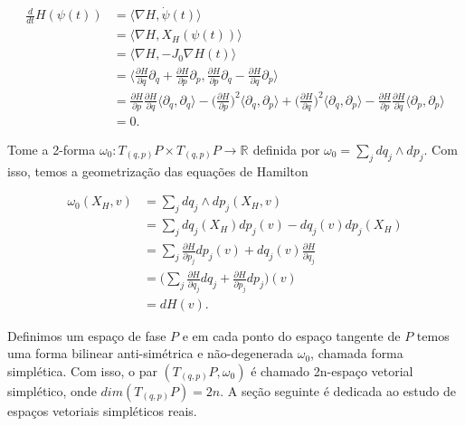 \documentclass[12pt]{book}
\newcommand{\bigparenteses}[1]{\Big( #1 \Big) }
\newcommand{\campohamiltoniano}[1]{X_{H}(#1)}
\newcommand{\campohamiltonianoabrev}{X_{H}}
\newcommand{\derivada}[2]{\frac{d #1}{d #2}}
\newcommand{\derivadaparcial}[2]{\frac{\partial #1}{\partial #2}}
\newcommand{\derivadaparcialabrev}[1]{\partial_{#1}}
\newcommand{\estruturacomplexa}{J_{0}}
\newcommand{\formaSimpleticaabrev}{\omega_{0}}
\newcommand{\formaSimpleticaPadrao}[2]{\omega_{0}(#1, #2)}
\newcommand{\produtointerno}[2]{\langle #1, #2 \rangle}
\newcommand{\real}[1]{\mathbb{R}^{#1}}
\newcommand{\reta}{\real{}}
\begin{document}
	$$
	\begin{aligned}
	\derivada{}{t}H(\psi(t)) 
	&= \produtointerno{\nabla H}{\dot{\psi}(t)} 
	\\
	&= \produtointerno{\nabla H}{\campohamiltoniano{\psi(t)}} 
	\\
	&= 
	\produtointerno{\nabla H}{-\estruturacomplexa \nabla H(t)} 
	\\
	&=\produtointerno{\derivadaparcial{H}{q}\derivadaparcialabrev{q} + \derivadaparcial{H}{p}\derivadaparcialabrev{p}
	}{\derivadaparcial{H}{p}\derivadaparcialabrev{q} - \derivadaparcial{H}{q}\derivadaparcialabrev{p}}
	\\
	&=\derivadaparcial{H}{p}\derivadaparcial{H}{q}\produtointerno{\derivadaparcialabrev{q}}{\derivadaparcialabrev{q}}-\bigparenteses{\derivadaparcial{H}{p}}^{2}\produtointerno{\derivadaparcialabrev{q}
	}{\derivadaparcialabrev{p}}	
	+\bigparenteses{\derivadaparcial{H}{q}}^{2}\produtointerno{\derivadaparcialabrev{q}}{\derivadaparcialabrev{p}}
	-\derivadaparcial{H}{p}\derivadaparcial{H}{q}\produtointerno{\derivadaparcialabrev{p}}{\derivadaparcialabrev{p}}
	\\
	&=0.
	\end{aligned}
	$$
	
	Tome a 2-forma $\formaSimpleticaabrev :T_{(q,p)} P \times T_{(q,p)} P \to \reta$ definida por $\formaSimpleticaabrev = \sum_{j}  dq_{j}\wedge dp_{j}$. Com isso, temos a geometrização das equações de Hamilton
	
	$$
	\begin{aligned}
	\formaSimpleticaPadrao{\campohamiltonianoabrev}{v} 
	&= \sum_{j}  dq_{j}\wedge dp_{j}(\campohamiltonianoabrev, v) 
	\\
	&= \sum_{j}  dq_{j}(\campohamiltonianoabrev)dp_{j}(v) - dq_{j}(v)dp_{j}(\campohamiltonianoabrev)
	\\
	&= \sum_{j} \derivadaparcial{H}{p_{j}}dp_{j}(v) + dq_{j}(v)\derivadaparcial{H}{q_{j}}
	\\
	&= \Big(\sum_{j} \derivadaparcial{H}{q_{j}}dq_{j} +\derivadaparcial{H}{p_{j}}dp_{j} \Big)(v)
	\\
	&= dH(v).
	\end{aligned}
	$$
	
	Definimos um espaço de fase $P$ e em cada ponto do espaço tangente de $P$ temos uma forma bilinear anti-simétrica e não-degenerada $\formaSimpleticaabrev$, chamada forma simplética. Com isso, o par $(T_{(q,p)}P, \formaSimpleticaabrev)$ é chamado 2n-espaço vetorial simplético, onde $dim(T_{(q,p)}P) = 2n$. A seção seguinte é dedicada ao estudo de espaços vetoriais simpléticos reais.
	
\end{document}
